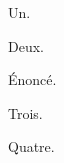 \begin{remark}
  Un.
\end{remark}
\begin{remark}
  Deux.
\end{remark}
\begin{theorem}
  Énoncé.
\end{theorem}
\begin{remark}
  Trois.
\end{remark}
\begin{remark}
  Quatre.
\end{remark}
